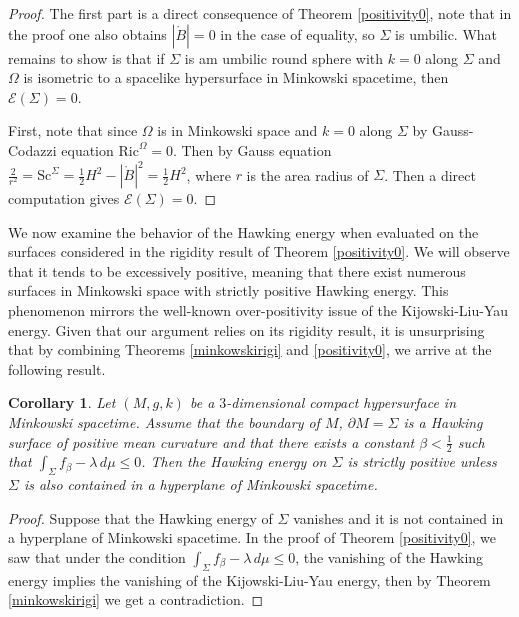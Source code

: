 \documentclass[12pt,a4paper]{amsart}
\theoremstyle{plain}
\newtheorem{corollary}[theorem]{Corollary}
\theoremstyle{definition}
\begin{document}
\begin{proof}
The first part is a direct consequence of Theorem \ref{positivity0}, note that in the proof one also obtains  $|\mathring{B}|=0$ in the case of equality, so $\Sigma$ is umbilic. What remains to show is that if $\Sigma$ is am umbilic round sphere with $k=0$ along $\Sigma$ and $\Omega$ is isometric to a spacelike hypersurface  in Minkowski spacetime, then $\mathcal{E}(\Sigma) =0 $.

First, note that since $\Omega$ is  in Minkowski space and $k=0$ along $\Sigma$ by Gauss-Codazzi equation  $\mathrm{Ric}^\Omega=0 $. Then by Gauss equation $\frac{2}{r^2}=\mathrm{Sc}^\Sigma = \frac{1}{2}H^2- |\mathring{B}|^2 =\frac{1}{2}H^2 $, where $r$ is the area radius of $\Sigma$. Then a direct computation  gives $\mathcal{E}(\Sigma) =0 $. 
\end{proof}
We now examine the behavior of the Hawking energy when evaluated on the surfaces considered in the rigidity result of Theorem \ref{positivity0}. We will observe that it tends to be excessively positive, meaning that there exist numerous surfaces in Minkowski space with strictly positive Hawking energy. This phenomenon mirrors the well-known over-positivity issue of the Kijowski-Liu-Yau energy. Given that our argument relies on its rigidity result, it is unsurprising that by combining Theorems \ref{minkowskirigi} and \ref{positivity0}, we arrive at the following result. 
\begin{corollary}
  Let $(M,g,k)$ be a $3$-dimensional compact hypersurface in Minkowski spacetime. Assume that the boundary of $M $, $\partial M =\Sigma $   is a Hawking surface of positive mean curvature and that there exists a constant $\beta <\frac{1}{2}$ such that $\int_\Sigma f_\beta -\lambda \, d\mu \leq 0$. Then the Hawking energy on $\Sigma$ is strictly positive unless $\Sigma$ is also  contained in a hyperplane of Minkowski spacetime.  
\end{corollary}
\begin{proof}
    Suppose that the Hawking energy of $\Sigma$ vanishes and it is not contained in a hyperplane of Minkowski spacetime. In the proof of Theorem \ref{positivity0}, we saw that under the condition  $\int_\Sigma f_\beta -\lambda \, d\mu \leq 0$, the vanishing of the Hawking energy implies the vanishing of the Kijowski-Liu-Yau energy, then by Theorem \ref{minkowskirigi} we get a contradiction.
\end{proof}
\end{document}
